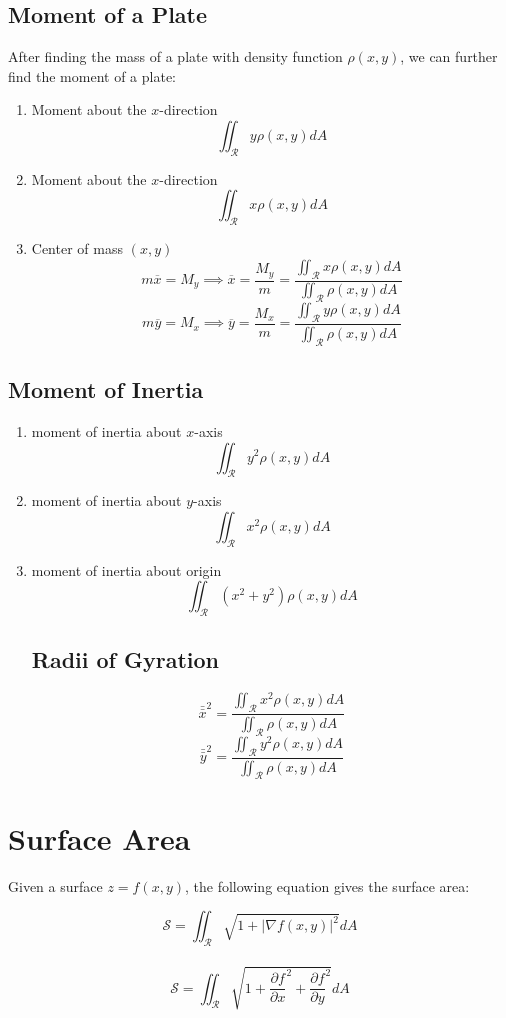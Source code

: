 \documentclass[UTF8,a4paper, 10pt, openany]{book}
\begin{document}
\subsection{Moment of a Plate}
After finding the mass of a plate with density function $\rho (x,y)$, we can further find the moment of a plate:\\
\begin{enumerate}
\item Moment about the $x$-direction
$$\iint_{\mathcal{R}}y\rho (x,y)dA$$
\item Moment about the $x$-direction
$$\iint_{\mathcal{R}}x\rho (x,y)dA$$
\item Center of mass $(x,y)$
$$m\overline{x}=M_y \implies \overline{x}=\dfrac{M_y}{m}=\dfrac{\displaystyle\iint_{\mathcal{R}}x\rho (x,y)dA}{\displaystyle\iint_{\mathcal{R}}\rho (x,y)dA}$$
$$m\overline{y}=M_x \implies \overline{y}=\dfrac{M_x}{m}=\dfrac{\displaystyle\iint_{\mathcal{R}}y\rho (x,y)dA}{\displaystyle\iint_{\mathcal{R}}\rho (x,y)dA}$$
\end{enumerate}
\subsection{Moment of Inertia}
\begin{enumerate}
\item moment of inertia about $x$-axis
$$\iint_{\mathcal{R}}y^2\rho (x,y)dA$$
\item moment of inertia about $y$-axis
$$\iint_{\mathcal{R}}x^2\rho (x,y)dA$$
\item moment of inertia about origin\
$$\iint_{\mathcal{R}}(x^2+y^2)\rho (x,y)dA$$
\subsection{Radii of Gyration}
$$\bar{\bar{x}}^2=\dfrac{\displaystyle\iint_{\mathcal{R}}x^2\rho (x,y)dA}{\displaystyle\iint_{\mathcal{R}}\rho (x,y)dA}$$
$$\bar{\bar{y}}^2=\dfrac{\displaystyle\iint_{\mathcal{R}}y^2\rho (x,y)dA}{\displaystyle\iint_{\mathcal{R}}\rho (x,y)dA}$$
\end{enumerate}
\section{Surface Area}
Given a surface $z=f(x,y)$, the following equation gives the surface area:
\begin{center}
$$\mathcal{S}=\iint_{\mathcal{R}}\sqrt{1+|\nabla f(x,y)|^2}dA$$\\
$$\mathcal{S}=\iint_{\mathcal{R}}\sqrt{1+\dfrac{\partial f}{\partial x}^2+\dfrac{\partial f}{\partial y}^2}dA$$
\end{center}
\end{document}
